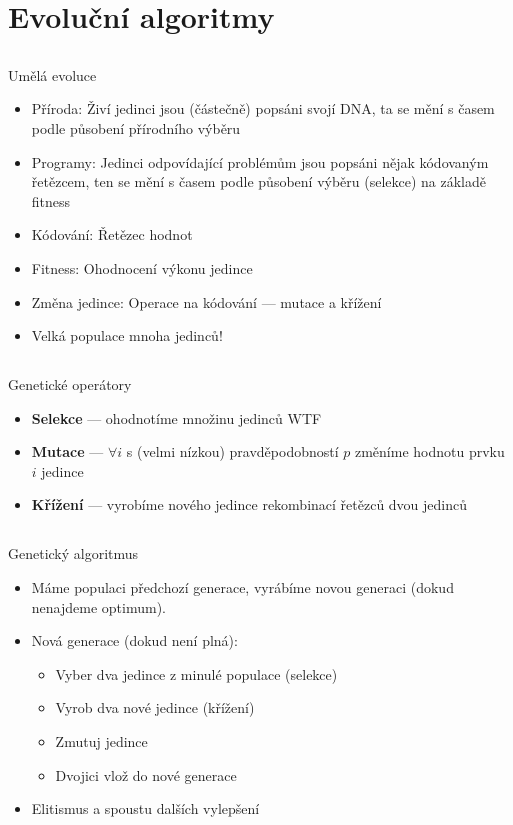 \documentclass{beamer}
\begin{document}
\section{Evoluční algoritmy}

\subsection{}
\begin{frame}{Umělá evoluce}
\begin{itemize}
\item Příroda: Živí jedinci jsou (částečně) popsáni svojí DNA, ta se mění s časem podle působení přírodního výběru
\item Programy: Jedinci odpovídající problémům jsou popsáni nějak kódovaným řetězcem, ten se mění s časem podle působení výběru (selekce) na základě fitness
\item Kódování: Řetězec hodnot
\item Fitness: Ohodnocení výkonu jedince
\item Změna jedince: Operace na kódování --- mutace a křížení
\item Velká populace mnoha jedinců!
\end{itemize}
\end{frame}

\subsection{}
\begin{frame}{Genetické operátory}
\begin{itemize}
\item {\bf Selekce} --- ohodnotíme množinu jedinců WTF
\item {\bf Mutace} --- $\forall i$ s (velmi nízkou) pravděpodobností $p$ změníme hodnotu prvku $i$ jedince
\item {\bf Křížení} --- vyrobíme nového jedince rekombinací řetězců dvou jedinců
\end{itemize}
\end{frame}

\subsection{}
\begin{frame}{Genetický algoritmus}
\begin{itemize}
\item Máme populaci předchozí generace, vyrábíme novou generaci (dokud nenajdeme optimum).
\item Nová generace (dokud není plná):
\begin{itemize}
\item Vyber dva jedince z minulé populace (selekce)
\item Vyrob dva nové jedince (křížení)
\item Zmutuj jedince
\item Dvojici vlož do nové generace
\end{itemize}
\item Elitismus a spoustu dalších vylepšení
\end{itemize}
\end{frame}
\end{document}

